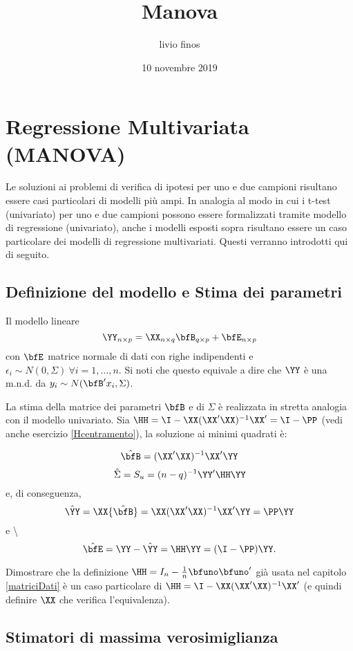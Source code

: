\documentclass[]{article}
\title{Manova}
\author{livio finos}
\date{10 novembre 2019}
\begin{document}
\maketitle

\section{Regressione Multivariata (MANOVA)}\label{MANOVA}

Le soluzioni ai problemi di verifica di ipotesi per uno e due campioni
risultano essere casi particolari di modelli più ampi. In analogia al
modo in cui i t-test (univariato) per uno e due campioni possono essere
formalizzati tramite modello di regressione (univariato), anche i
modelli esposti sopra risultano essere un caso particolare dei modelli
di regressione multivariati. Questi verranno introdotti qui di seguito.

\subsection{Definizione del modello e Stima dei parametri}

Il modello lineare\\
\[\YY_{n\times p}=\XX_{n\times q}\bfB_{q\times p} + \bfE_{n\times p}\]
con \(\bfE\) matrice normale di dati con righe indipendenti e
\(\epsilon_i\sim N(0,\Sigma)\ \forall i=1,\ldots,n\). Si noti che questo
equivale a dire che \(\YY\) è una m.n.d. da
\(y_i\sim N(\bfB' x_i,\Sigma)\).

La stima della matrice dei parametri \(\bfB\) e di \(\Sigma\) è
realizzata in stretta analogia con il modello univariato. Sia
\(\HH =\I - \XX(\XX'\XX)^{-1}\XX'=\I - \PP\) (vedi anche esercizio
\ref{Hcentramento}), la soluzione ai minimi quadrati è:

\[\hat{\bfB}=(\XX'\XX)^{-1}\XX'\YY\]
\[\hat{\Sigma}=S_u=(n-q)^{-1}\YY'\HH\YY\] e, di conseguenza,
\[\hat{\YY}=\XX{\hat \bfB} =\XX(\XX'\XX)^{-1}\XX'\YY=\PP\YY\] e
\textbackslash{} \[\hat{\bfE}=\YY-\hat{\YY}=\HH\YY=(\I-\PP)\YY.\]

\begin{ExerciseList}
\Exercise  \label{Hcentramento} Dimostrare che la definizione $\HH=I_n-\frac{1}{n} \bfuno\bfuno'$ già usata nel capitolo \ref{matriciDati} è un caso particolare di $\HH=\I - \XX(\XX'\XX)^{-1}\XX'$ (e quindi definire $\XX$ che verifica l'equivalenza).
\end{ExerciseList}

\subsection{Stimatori di massima verosimiglianza}
\end{document}
